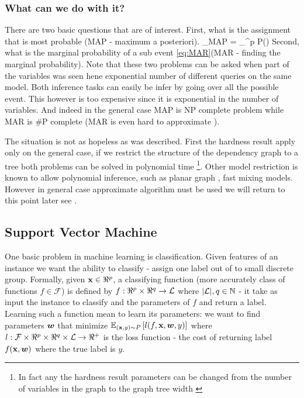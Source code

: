 \subsubsection{What can we do with it?}
There are two basic questions that are of interest.
First, what is the assignment that is most probable (MAP - maximum a posteriori).
\be
\label{eq:MAP}
\xx_{MAP} = \arg \max_{\xx \in \cX^p} P(\xx) 
\ee
Second, what is the marginal probability of a sub event \eqref{eq:MAR}(MAR - finding the marginal probability).
Note that these two problems can be asked when part of the variables was seen hene exponential number of different queries on the same model. 
Both inference tasks can easily be infer by going over all the possible event.
This however is too expensive since it is exponential in the number of variables.
And indeed in the general case MAP\cite{shimony1994finding} is NP complete problem while MAR\cite{cooper1990computational} is \#P complete (MAR is even hard to approximate \cite{roth1996hardness}).

The situation is not as hopeless as was described.
First the hardness result apply only on the general case, if we restrict the structure of the dependency graph to a tree both problems can be solved in polynomial time \footnote{In fact any the hardness result parameters can be changed from the number of variables in the graph to the graph tree width \cite{robertson1983graph,robertson1994quickly} }.
Other model restriction is known to allow polynomial inference, such as planar graph \cite{jaakkola2007approximate}, fast mixing models\cite{jerrum1993polynomial}.
However in general case approximate algorithm nust be used we will return to this point later see . 

\subsection{Support Vector Machine}
One basic problem in machine learning is classification.
Given features of an instance we want the ability to classify - assign one label out of to small discrete group.
Formally, given ${\bf x} \in \Re^p$, a classifying function (more accurately class of functions $f \in \mathcal{F}$) is defined by $f: \Re^p \times \Re^q \to {\cal L}$ where $|{\cal L}|,q \in \mathbb{N}$  - it take as input the instance to classify and the parameters of $f$  and return a label.
Learning such a function mean to learn its parameters: we want to find parameters  $\boldsymbol{w}$ that minimize $\mathbb{E}_{({\bf x},y) \sim P}\left[{l(f,{\bf x}, \boldsymbol{w} ,y)}\right]$ where $l : \mathcal{F} \times\Re^p\times \Re^q \times {\cal L} \to \Re^{+}$ is the loss function - the cost of returning label $f({\bf x},\boldsymbol{w})$ where the true label is $y$.

